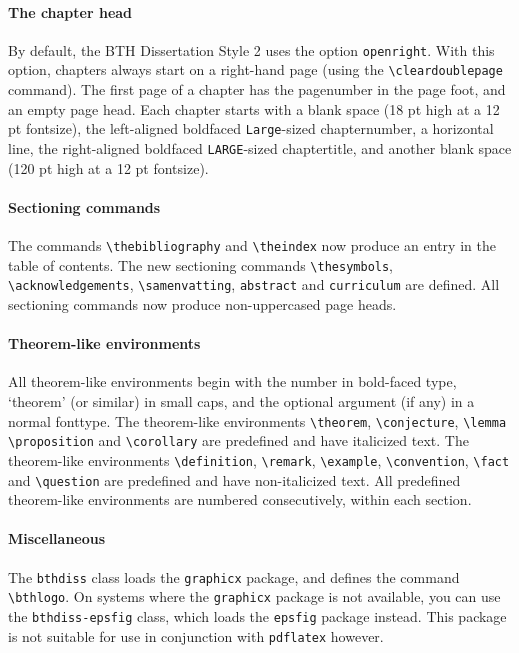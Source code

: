 \paragraph*{The chapter head}
By default, the BTH Dissertation Style 2 uses the option \verb|openright|.
With this option, chapters always start on a right-hand page (using the \verb|\cleardoublepage| command).
The first page of a chapter has the pagenumber in the page foot, and an empty page head.
Each chapter starts with a blank space (18 pt high at a 12 pt fontsize), the left-aligned boldfaced \verb|Large|-sized chapternumber, a horizontal line, the right-aligned boldfaced \verb|LARGE|-sized chaptertitle, and another blank space (120 pt high at a 12 pt fontsize).

\paragraph*{Sectioning commands}
The commands \verb|\thebibliography| and \verb|\theindex| now produce an entry in the table of contents.
The new sectioning commands \verb|\thesymbols|, \verb|\acknowledgements|, \verb|\samenvatting|, \verb|abstract| and \verb|curriculum| are defined.
All sectioning commands now produce non-uppercased page heads.

\paragraph*{Theorem-like environments}
All theorem-like environments begin with the number in bold-faced type, `theorem' (or similar) in small caps, and the optional argument (if any) in a normal fonttype.
The theorem-like environments
\verb|\theorem|,
\verb|\conjecture|,
\verb|\lemma|
\verb|\proposition| and
\verb|\corollary|
are predefined and have italicized text.
The theorem-like environments
\verb|\definition|,
\verb|\remark|,
\verb|\example|,
\verb|\convention|,
\verb|\fact| and
\verb|\question|
are predefined and have non-italicized text.
All predefined theorem-like environments are numbered consecutively, within each section.

\paragraph*{Miscellaneous}
The \verb|bthdiss| class loads the \verb|graphicx| package, and defines the command \verb|\bthlogo|.
On systems where the \verb|graphicx| package is not available, you can use the \verb|bthdiss-epsfig| class, which loads the \verb|epsfig| package instead. This package is not suitable for use in conjunction with \verb|pdflatex| however.
